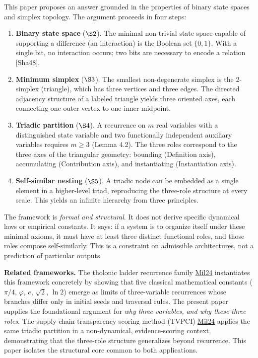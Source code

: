 \documentclass[12pt]{article}
\providecommand{\tightlist}{%
  \setlength{\itemsep}{0pt}\setlength{\parskip}{0pt}}
\begin{document}
This paper proposes an answer grounded in the properties of binary state
spaces and simplex topology. The argument proceeds in four steps:

\begin{enumerate}
\def\labelenumi{\arabic{enumi}.}
\tightlist
\item
  \textbf{Binary state space} (\(\S 2\)). The minimal non-trivial state
  space capable of supporting a difference (an interaction) is the
  Boolean set \(\{0, 1\}\). With a single bit, no interaction occurs;
  two bits are necessary to encode a relation {[}Sha48{]}.
\item
  \textbf{Minimum simplex} (\(\S 3\)). The smallest non-degenerate
  simplex is the 2-simplex (triangle), which has three vertices and
  three edges. The directed adjacency structure of a labeled triangle
  yields three oriented axes, each connecting one outer vertex to one
  inner midpoint.
\item
  \textbf{Triadic partition} (\(\S 4\)). A recurrence on \(m\) real
  variables with a distinguished state variable and two functionally
  independent auxiliary variables requires \(m \ge 3\) (Lemma 4.2). The
  three roles correspond to the three axes of the triangular geometry:
  bounding (Definition axis), accumulating (Contribution axis), and
  instantiating (Instantiation axis).
\item
  \textbf{Self-similar nesting} (\(\S 5\)). A triadic node can be
  embedded as a single element in a higher-level triad, reproducing the
  three-role structure at every scale. This yields an infinite hierarchy
  from three principles.
\end{enumerate}

The framework is \emph{formal and structural}. It does not derive
specific dynamical laws or empirical constants. It says: if a system is
to organize itself under these minimal axioms, it must have at least
three distinct functional roles, and those roles compose self-similarly.
This is a constraint on admissible architectures, not a prediction of
particular outputs.

\textbf{Related frameworks.} The tholonic ladder recurrence family
\href{https://tholonia.github.io/the-book/}{Mil24} instantiates this
framework concretely by showing that five classical mathematical
constants (\(\pi/4\), \(\varphi\), \(e\), \(\sqrt{2}\), \(\ln 2\))
emerge as limits of three-variable recurrences whose branches differ
only in initial seeds and traversal rules. The present paper supplies
the foundational argument for \emph{why three variables, and why these
three roles}. The supply-chain transparency scoring method (TVPCI)
\href{https://tholonia.github.io/the-book/}{Mil24} applies the same
triadic partition in a non-dynamical, evidence-scoring context,
demonstrating that the three-role structure generalizes beyond
recurrence. This paper isolates the structural core common to both
applications.
\end{document}
